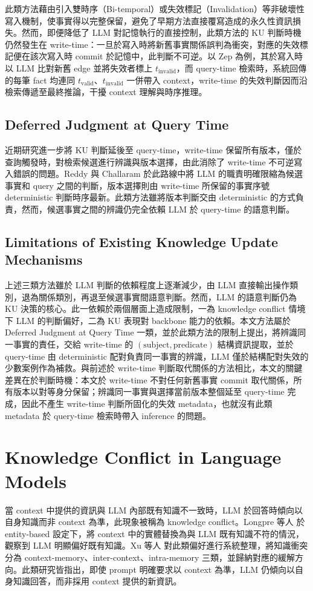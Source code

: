 此類方法藉由引入雙時序（Bi-temporal）或失效標記（Invalidation）等非破壞性寫入機制，使事實得以完整保留，避免了早期方法直接覆寫造成的永久性資訊損失。然而，即便降低了 LLM 對記憶執行的直接控制，此類方法的 KU 判斷時機仍然發生在 write-time：一旦於寫入時將新舊事實關係誤判為衝突，對應的失效標記便在該次寫入時 commit 於記憶中，此判斷不可逆。以 Zep 為例，其於寫入時以 LLM 比對新舊 edge 並將失效者標上 $t_{\text{invalid}}$，而 query-time 檢索時，系統回傳的每筆 fact 均連同 $t_{\text{valid}}$、$t_{\text{invalid}}$ 一併帶入 context，write-time 的失效判斷因而沿檢索傳遞至最終推論，干擾 context 理解與時序推理。

\subsection{Deferred Judgment at Query Time}
近期研究進一步將 KU 判斷延後至 query-time，write-time 保留所有版本，僅於查詢觸發時，對檢索候選進行辨識與版本選擇，由此消除了 write-time 不可逆寫入錯誤的問題。Reddy 與 Challaram \cite{reddy2026don} 於此路線中將 LLM 的職責明確限縮為候選事實和 query 之間的判斷，版本選擇則由 write-time 所保留的事實序號 deterministic 判斷時序最新。此類方法雖將版本判斷交由 deterministic 的方式負責，然而，候選事實之間的辨識仍完全依賴 LLM 於 query-time 的語意判斷。

\subsection{Limitations of Existing Knowledge Update Mechanisms}
上述三類方法雖於 LLM 判斷的依賴程度上逐漸減少，由 LLM 直接輸出操作類別，退為關係類別，再退至候選事實間語意判斷。然而，LLM 的語意判斷仍為 KU 決策的核心。此一依賴於兩個層面上造成限制，一為 knowledge conflict 情境下 LLM 的判斷偏好，二為 KU 表現對 backbone 能力的依賴。本文方法屬於 Deferred Judgment at Query Time 一類，並於此類方法的限制上提出，將辨識同一事實的責任，交給 write-time 的 $(\text{subject}, \text{predicate})$ 結構資訊提取，並於 query-time 由 deterministic 配對負責同一事實的辨識，LLM 僅於結構配對失效的少數案例作為補救。與前述於 write-time 判斷取代關係的方法相比，本文的關鍵差異在於判斷時機：本文於 write-time 不對任何新舊事實 commit 取代關係，所有版本以對等身分保留；辨識同一事實與選擇當前版本整個延至 query-time 完成，因此不產生 write-time 判斷所固化的失效 metadata，也就沒有此類 metadata 於 query-time 檢索時帶入 inference 的問題。

\section{Knowledge Conflict in Language Models}
\label{sec:rw_conflict}
當 context 中提供的資訊與 LLM 內部既有知識不一致時，LLM 於回答時傾向以自身知識而非 context 為準，此現象被稱為 knowledge conflict。Longpre 等人 \cite{longpre2021entity} 於 entity-based 設定下，將 context 中的實體替換為與 LLM 既有知識不符的情況，觀察到 LLM 明顯偏好既有知識。Xu 等人 \cite{xu2024knowledge} 對此類偏好進行系統整理，將知識衝突分為 context-memory、inter-context、intra-memory 三類，並歸納對應的緩解方向。此類研究皆指出，即使 prompt 明確要求以 context 為準，LLM 仍傾向以自身知識回答，而非採用 context 提供的新資訊。

